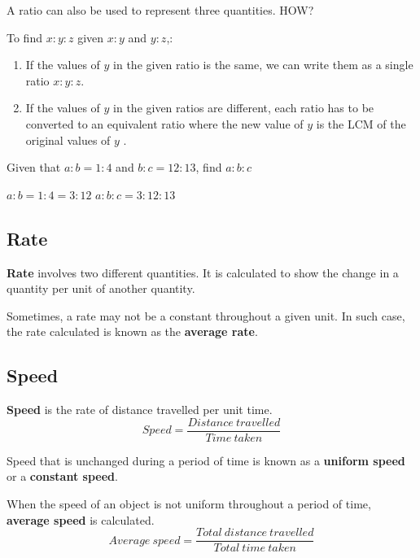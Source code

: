 \documentclass[../main]{subfiles}
\begin{document}
A ratio can also be used to represent three quantities. HOW?

To find \(x:y:z\) given \(x:y\) and \(y:z\),:
\begin{enumerate}
\item If the values of $y$ in the given ratio is the same, we can write them as
  a single ratio \(x:y:z\).
 
\item If the values of $y$ in the given ratios are different, each ratio has to
  be converted to an equivalent ratio where the new value of $y$ is the LCM of
  the original values of $y$ .
  
\end{enumerate}

Given that \(a:b=1:4\) and \(b:c=12:13\), find \(a:b:c\)

\(a:b=1:4 = 3:12\)
\(a:b:c=3:12:13\)

\subsection{Rate}
\textbf{Rate} involves two different quantities. It is calculated to show the
change in a quantity per unit of another quantity.

Sometimes, a rate may not be a constant throughout a given unit. In such case,
the rate calculated is known as the \textbf{average rate}.

\subsection{Speed}
\textbf{Speed} is the rate of distance travelled per unit time.
\[Speed = {\frac {Distance\ travelled} {Time\ taken}}\]


Speed that is unchanged during a period of time is known as a \textbf{uniform
  speed} or a \textbf{constant speed}.

When the speed of an object is not uniform throughout a period of time,
\textbf{average speed} is calculated.
\[Average\ speed={\frac {Total\ distance\ travelled} {Total \ time \ taken}}\]
\end{document}
